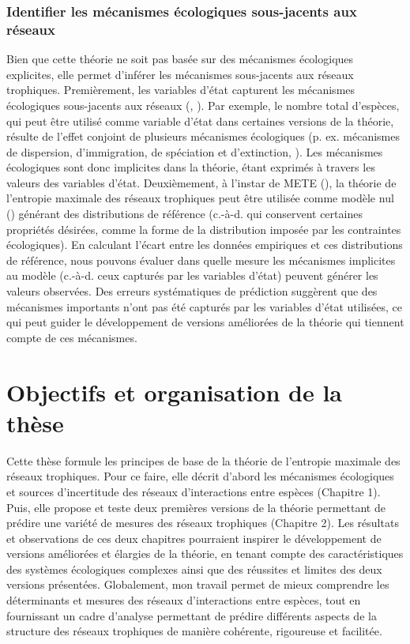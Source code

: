 \subsubsection{Identifier les mécanismes écologiques sous-jacents aux réseaux} 

Bien que cette théorie ne soit pas basée sur des mécanismes écologiques
explicites, elle permet d'inférer les mécanismes sous-jacents aux réseaux
trophiques. Premièrement, les variables d'état capturent les mécanismes
écologiques sous-jacents aux réseaux (\cite{White2012Characterizing},
\cite{McGill2010Mechanisms}). Par exemple, le nombre total d'espèces, qui peut
être utilisé comme variable d'état dans certaines versions de la théorie,
résulte de l'effet conjoint de plusieurs mécanismes écologiques (p. ex.
mécanismes de dispersion, d'immigration, de spéciation et d'extinction,
\cite{Whittaker2001Scale}). Les mécanismes écologiques sont donc implicites dans
la théorie, étant exprimés à travers les valeurs des variables d'état.
Deuxièmement, à l'instar de METE (\cite{Harte2014Maximuma}), la théorie de
l'entropie maximale des réseaux trophiques peut être utilisée comme modèle nul
(\cite{Fortuna2006Habitat}) générant des distributions de référence (c.-à-d. qui
conservent certaines propriétés désirées, comme la forme de la distribution
imposée par les contraintes écologiques). En calculant l'écart entre les données
empiriques et ces distributions de référence, nous pouvons évaluer dans quelle
mesure les mécanismes implicites au modèle (c.-à-d. ceux capturés par les
variables d'état) peuvent générer les valeurs observées. Des erreurs
systématiques de prédiction suggèrent que des mécanismes importants n'ont pas
été capturés par les variables d'état utilisées, ce qui peut guider le
développement de versions améliorées de la théorie qui tiennent compte de ces
mécanismes. 


\section{Objectifs et organisation de la thèse} 

Cette thèse formule les principes de base de la théorie de l'entropie maximale
des réseaux trophiques. Pour ce faire, elle décrit d'abord les mécanismes
écologiques et sources d'incertitude des réseaux d'interactions entre espèces
(Chapitre 1). Puis, elle propose et teste deux premières versions de la théorie
permettant de prédire une variété de mesures des réseaux trophiques (Chapitre
2). Les résultats et observations de ces deux chapitres pourraient inspirer le
développement de versions améliorées et élargies de la théorie, en tenant compte
des caractéristiques des systèmes écologiques complexes ainsi que des réussites
et limites des deux versions présentées. Globalement, mon travail permet de
mieux comprendre les déterminants et mesures des réseaux d'interactions entre
espèces, tout en fournissant un cadre d'analyse permettant de prédire différents
aspects de la structure des réseaux trophiques de manière cohérente, rigoureuse
et facilitée.

